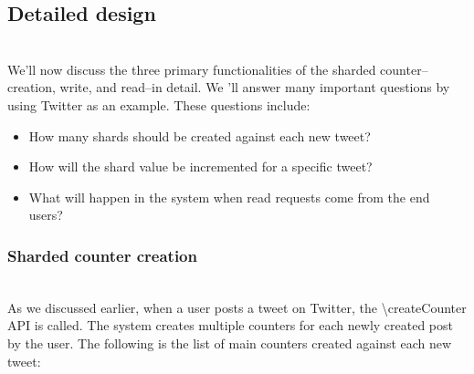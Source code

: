 

\subsection{Detailed design}\label{_D8-culYLl5Ut1PX1Zoy1}
\\
We'll now discuss the three primary functionalities of the sharded counter--creation, write, and read--in detail. We 'll answer many important questions by using Twitter as an example. These questions include:

\begin{itemize}
\item
\protect{}\label{cXBhxk8K-n1i6dEv-jG0e}
How many shards should be created against each new tweet?
\item
\protect{}\label{zrgAa1oDBEcsPF7eh2-rf}
How will the shard value be incremented for a specific tweet?
\item
\protect{}\label{SWYkMnhhaYK9FiRJibM6p}
What will happen in the system when read requests come from the end users?
\end{itemize}

\subsubsection{Sharded counter creation}\label{R9qO-QxyCl0hvHW-lnTXk}
\\
As we discussed earlier, when a user posts a tweet on Twitter, the \textbackslash{createCounter} API is called. The system creates multiple counters for each newly created post by the user. The following is the list of main counters created against each new tweet:

